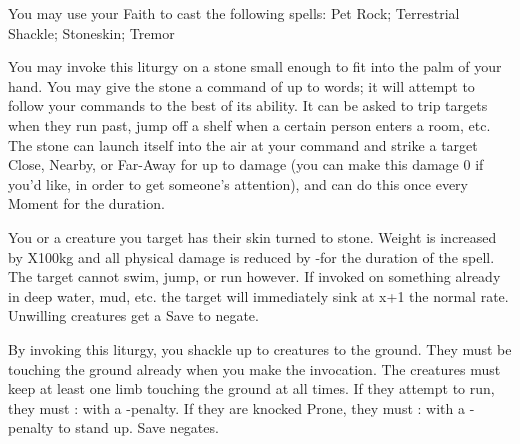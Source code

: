 {

You may use your Faith to cast the following spells: Pet Rock; Terrestrial Shackle; Stoneskin; Tremor

\LITURGY [
  Name= Pet Rock,
  Link= raimonds-liturgy-pet-rock,
  Paradigm= Elements ,
  Save=  N ,
  Duration= Combat or \SUMDICE Minutes ,
  Counter=  n/a  ,
  Keywords= None ,
  Target=   Close (touch) Stone
]



You may invoke this liturgy on a stone small enough to fit into the palm of your hand.  You may give the stone a command of up to \DICE words; it will attempt to follow your commands to the best of its ability.  It can be asked to trip targets when they run past, jump off a shelf when a certain person enters a room, etc.  The stone can launch itself into the air at your command and strike a target Close, Nearby, or Far-Away for up to \DICE damage (you can make this damage 0 if you'd like, in order to get someone's attention), and can do this once every Moment for the duration.

\LITURGY [
  Name= Stoneskin,
  Link=raimonds-liturgy-stoneskin,
  Paradigm= Biomancy ,
  Save=  Y (negates) ,
  Duration= Combat or \SUMDICE Minutes ,
  Counter=  n/a  ,
  Keywords= None ,
  Target=   Self or Close creature
]



You or a creature you target has their skin turned to stone.  Weight is increased by \DICE X100kg and all physical damage is reduced by -\DICE for the duration of the spell.  The target cannot swim, jump, or run however. If invoked on something already in deep water, mud, etc. the target will immediately sink at x\DICE+1 the normal rate. Unwilling creatures get a Save to negate. 

\LITURGY [
  Name= Terrestrial Shackle,
  Link=raimonds-liturgy-terrestrial-shackle,
  Paradigm= Elements ,
  Save=  Y (negates) ,
  Duration= Markovian ,
  Counter=  n/a  ,
  Keywords= Splittable ,
  Target=   Close; Nearby; or Far-Away creatures
]



By invoking this liturgy, you shackle up to \DICE creatures to the ground.  They must be touching the ground already when you make the invocation.  The creatures must keep at least one limb touching the ground at all times.  If they attempt to run, they must \RB : \DEX with a -\DICE penalty.  If they are knocked Prone, they must \RB : \VIG with a -\DICE penalty to stand up.  Save negates.

}
